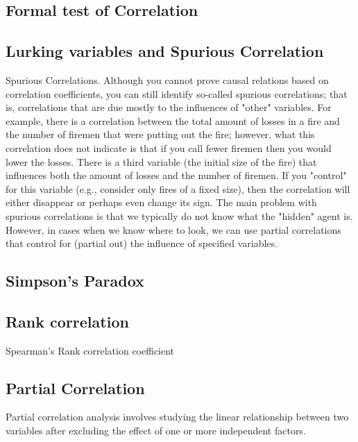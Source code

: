\subsection{Formal test of Correlation}
\subsection{Lurking variables and Spurious Correlation}
Spurious Correlations. Although you cannot prove causal relations based on correlation coefficients, you can still identify so-called spurious correlations; that is, correlations that are due mostly to the influences of "other" variables. For example, there is a correlation between the total amount of losses in a fire and the number of firemen that were putting out the fire; however, what this correlation does not indicate is that if you call fewer firemen then you would lower the losses. There is a third variable (the initial size of the fire) that influences both the amount of losses and the number of firemen. If you "control" for this variable (e.g., consider only fires of a fixed size), then the correlation will either disappear or perhaps even change its sign. The main problem with spurious correlations is that we typically do not know what the "hidden" agent is. However, in cases when we know where to look, we can use partial correlations that control for (partial out) the influence of specified variables.



\subsection{Simpson's Paradox}
\subsection{Rank correlation}
Spearman's Rank correlation coefficient


\subsection{Partial Correlation}
Partial correlation analysis involves studying the linear relationship between two variables after excluding the effect of one or more independent factors.


